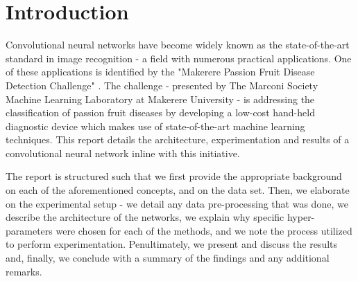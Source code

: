 \section{Introduction}
Convolutional neural networks have become widely known as the state-of-the-art standard in image recognition - a field with numerous practical applications. One of these applications is identified by the "Makerere Passion Fruit Disease Detection Challenge" \cite{zindi}. The challenge - presented by The Marconi Society Machine Learning Laboratory at Makerere University - is addressing the classification of passion fruit diseases by developing a low-cost hand-held diagnostic device which makes use of state-of-the-art machine learning techniques. This report details the architecture, experimentation and results of a convolutional neural network inline with this initiative.

The report is structured such that we first provide the appropriate background on each of the aforementioned concepts, and on the data set. Then, we elaborate on the experimental setup - we detail any data pre-processing that was done, we describe the architecture of the networks, we explain why specific hyper-parameters were chosen for each of the methods, and we note the process utilized to perform experimentation. Penultimately, we present and discuss the results and, finally, we conclude with a summary of the findings and any additional remarks.